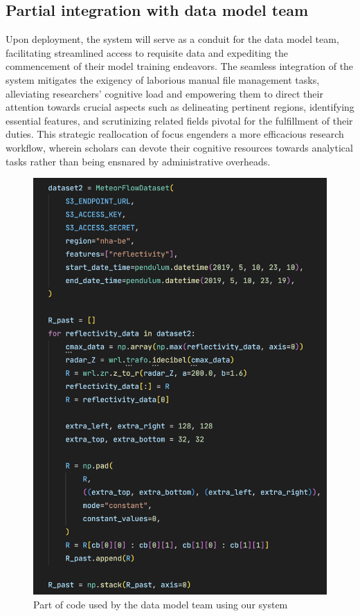 \subsection{Partial integration with data model team}

Upon deployment, the system will serve as a conduit for the data model team,
facilitating streamlined access to requisite data and expediting the
commencement of their model training endeavors. The seamless integration of the
system mitigates the exigency of laborious manual file management tasks,
alleviating researchers' cognitive load and empowering them to direct their
attention towards crucial aspects such as delineating pertinent regions,
identifying essential features, and scrutinizing related fields pivotal for the
fulfillment of their duties. This strategic reallocation of focus engenders a
more efficacious research workflow, wherein scholars can devote their cognitive
resources towards analytical tasks rather than being ensnared by administrative
overheads.

\begin{figure}[H]
    \centering
    \includegraphics[width=0.8\linewidth]{Images/5-data-model-loader.png}
    \vspace{1cm}
    \caption{Part of code used by the data model team using our system}
    \label{fig:data-model}
\end{figure}

